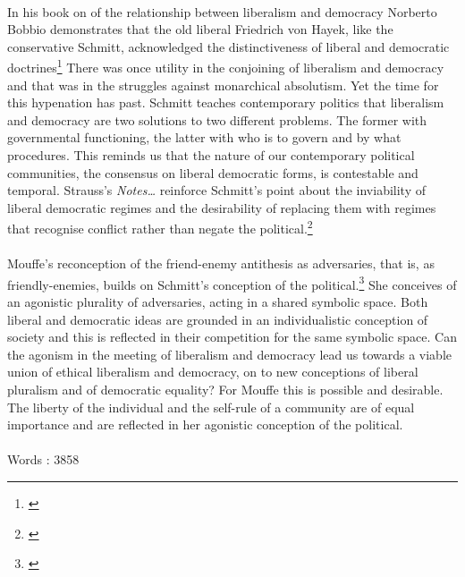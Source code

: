 \documentclass[12pt,a4paper,titlepage]{article}
\begin{document}
\paragraph{}In his book on of the relationship between liberalism and democracy Norberto Bobbio demonstrates that the old liberal Friedrich von Hayek, like the conservative Schmitt, acknowledged the distinctiveness of liberal and democratic doctrines\footnote{\cite[p.81]{Bobbio:2005vn}} There was once utility in the conjoining of liberalism and democracy and that was in the struggles against monarchical absolutism. Yet the time for this hypenation has past. Schmitt teaches contemporary politics that liberalism and democracy are two solutions to two different problems. The former with governmental functioning, the latter with who is to govern and by what procedures. This reminds us that the nature of our contemporary political communities, the consensus on liberal democratic forms, is contestable and temporal.  Strauss's \emph{Notes\ldots} reinforce Schmitt's point about the inviability of liberal democratic regimes and the desirability of replacing them with regimes that recognise conflict rather than negate the political.\footnote{\cite[Notes 5 \& 6]{Strauss:2007ncp}}

\paragraph{}Mouffe's reconception of the friend-enemy antithesis as adversaries, that is, as friendly-enemies, builds on Schmitt's conception of the political.\footnote{\cite[esp Ch.2 \& 4]{Mouffe:2000fk}} She conceives of an agonistic plurality of adversaries, acting in a shared symbolic space. Both liberal and democratic ideas are grounded in an individualistic conception of society and this is reflected in their competition for the same symbolic space. Can the agonism in the meeting of liberalism and democracy lead us towards a viable union of ethical liberalism and democracy, on to new conceptions of liberal pluralism and of democratic equality? For Mouffe this is possible and desirable. The liberty of the individual and the self-rule of a community are of equal importance and are reflected in her agonistic conception of the political.
\newpage
\singlespacing

\medskip
\paragraph{}Words : 3858
\end{document}
